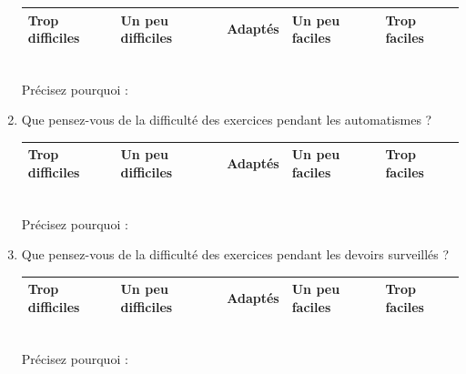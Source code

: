 \documentclass[oneside,12pt]{article}          %
\begin{document}
\begin{enumerate}[itemsep=5mm]
		\hspace{\linewidth-\textwidth}
		\renewcommand{\arraystretch}{1.5}
		\begin{tabular}{| P{0.175\textwidth} | P{0.175\textwidth} | P{0.175\textwidth} | P{0.175\textwidth} |  P{0.175\textwidth} |} \hline
			Trop difficiles & Un peu difficiles & Adaptés & Un peu faciles & Trop faciles \\ \hline
		\end{tabular}\\
		
		\hspace{\linewidth-\textwidth} Précisez pourquoi : 
		
		
		
	\item Que pensez-vous de la difficulté des exercices pendant les automatismes ?
	
		\hspace{\linewidth-\textwidth}
		\renewcommand{\arraystretch}{1.5}
		\begin{tabular}{| P{0.175\textwidth} | P{0.175\textwidth} | P{0.175\textwidth} | P{0.175\textwidth} |  P{0.175\textwidth} |} \hline
			Trop difficiles & Un peu difficiles & Adaptés & Un peu faciles & Trop faciles \\ \hline
		\end{tabular} \\
		
		\hspace{\linewidth-\textwidth} Précisez pourquoi : 
		
		
		
	\item Que pensez-vous de la difficulté des exercices pendant les devoirs surveillés ?
	
		\hspace{\linewidth-\textwidth}
		\renewcommand{\arraystretch}{1.5}
		\begin{tabular}{| P{0.175\textwidth} | P{0.175\textwidth} | P{0.175\textwidth} | P{0.175\textwidth} |  P{0.175\textwidth} |} \hline
			Trop difficiles & Un peu difficiles & Adaptés & Un peu faciles & Trop faciles \\ \hline
		\end{tabular} \\
		
		\hspace{\linewidth-\textwidth} Précisez pourquoi : 
		
\end{enumerate}
\end{document}
